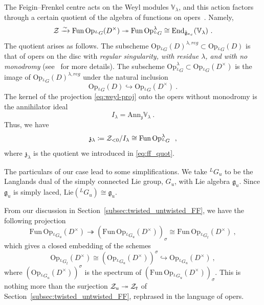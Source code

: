 \documentclass[a4paper]{article}
\def\IV{\mathbb{V}}
\def\ZZ{{\cal Z}}
\def\gf{\mathfrak{g}}
\def \zf{\mathfrak{z}}
\begin{document}
The Feigin--Frenkel centre acts on the Weyl modules $\IV_\lambda$, and this action factors through a certain quotient of the algebra of functions on opers~\cite{Frenkel:2010}. Namely,
\begin{equation}\label{eq:weyl-proj}
	\ZZ \xrightarrow{\sim} 	\mathrm{Fun}\,\mathrm{Op}_{^L G}(D^\times) \twoheadrightarrow\mathrm{Fun}\, \mathrm{Op}_{^L G}^{\lambda} \cong \mathrm{End}_{\hat{\gf}_{\kappa_c}}(\IV_\lambda)~.
\end{equation}
The quotient arises as follows. The subscheme $\mathrm{Op}_{^L G} (D)^{\lambda, reg}\subset\mathrm{Op}_{^L G}(D)$ is that of opers on the disc with \emph{regular singularity, with residue $\lambda$, and with no monodromy} (see~\cite{Frenkel:2007} for more details). The subscheme $\mathrm{Op}_{^L G}^{\lambda}\subset \mathrm{Op}_{^L G}(D^\times)$ is the image of $\mathrm{Op}_{^L G} (D)^{\lambda, reg}$ under the natural inclusion
\begin{equation}
	\mathrm{Op}_{^L G}(D)\hookrightarrow \mathrm{Op}_{^L G}(D^\times)~.
\end{equation}
The kernel of the projection \eqref{eq:weyl-proj} onto the opers without monodromy is the annihilator ideal
\begin{equation}
	I_\lambda= \mathrm{Ann}_{\zf}\IV_\lambda~.
\end{equation}
Thus, we have
\begin{equation}
	\zf_\lambda \coloneqq \ZZ_{<0}/I_\lambda \cong \mathrm{Fun}\,\mathrm{Op}_{^L G}^{\lambda}~~,
\end{equation}
where $\zf_{\lambda}$ is the quotient we introduced in \eqref{eq:ff_quot}.

The particulars of our case lead to some simplifications. We take $^LG_u$ to be the Langlands dual of the simply connected Lie group, $G_u$, with Lie algebra $\gf_u$. Since $\gf_u$ is simply laced, $\mathrm{Lie}(^LG_u)\cong\gf_u$.

From our discussion in Section~\ref{subsec:twisted_untwisted_FF}, we have the following projection
\begin{equation}
	\mathrm{Fun\, Op}_{^LG_u}(D^\times)\twoheadrightarrow(\mathrm{Fun\, Op}_{^LG_u}(D^\times))_\sigma\cong \mathrm{Fun\, Op}_{^LG_t}(D^\times)~,
\end{equation}
which gives a closed embedding of the schemes
\begin{equation}
	\mathrm{Op}_{^LG_t}(D^\times)\cong(\mathrm{Op}_{^LG_u}(D^\times))^\sigma \hookrightarrow \mathrm{Op}_{^LG_u}(D^\times)~,
\end{equation}
where $(\mathrm{Op}_{^LG_u}(D^\times))^\sigma$ is the spectrum of $(\mathrm{Fun\, Op}_{^LG_u}(D^\times))_\sigma$.
This is nothing more than the surjection $\ZZ_u\twoheadrightarrow \ZZ_t$ of Section~\ref{subsec:twisted_untwisted_FF}, rephrased in the language of opers.
\end{document}
